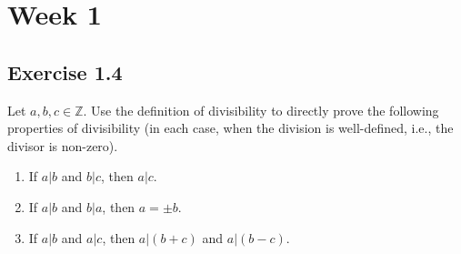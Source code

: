 \section*{Week 1}

\subsection*{Exercise 1.4}
Let $a, b, c \in \mathbb{Z}$. Use the definition of divisibility to directly prove the following properties of divisibility (in each case, when the division is well-defined, i.e., the divisor is non-zero).

\begin{enumerate}
    \item If $a|b$ and $b|c$, then $a|c$.
    \item If $a|b$ and $b|a$, then $a = \pm b$.
    \item If $a|b$ and $a|c$, then $a|(b+c)$ and $a|(b-c)$.
\end{enumerate}

